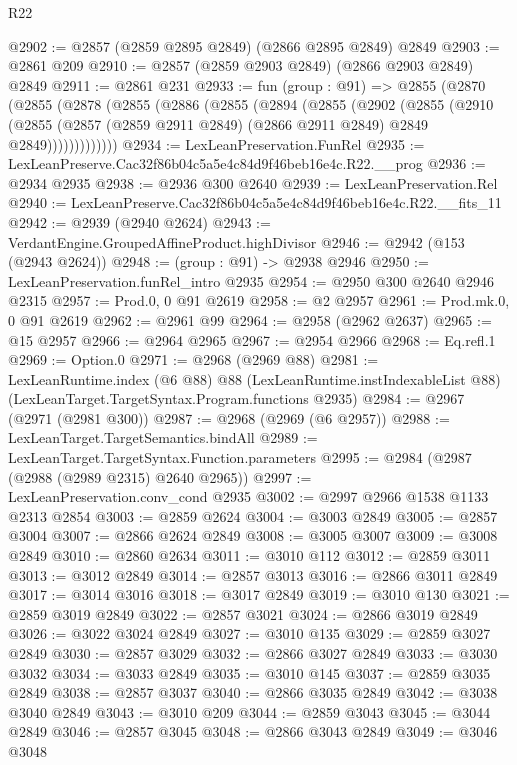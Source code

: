 \begin{lexlean}{R22}
\begin{coremodule}
@2902 := @2857 (@2859 @2895 @2849) (@2866 @2895 @2849) @2849
@2903 := @2861 @209
@2910 := @2857 (@2859 @2903 @2849) (@2866 @2903 @2849) @2849
@2911 := @2861 @231
@2933 := fun (group : @91) =>
  @2855
    (@2870
      (@2855
        (@2878
          (@2855
            (@2886
              (@2855
                (@2894
                  (@2855
                    (@2902
                      (@2855
                        (@2910
                          (@2855
                            (@2857 (@2859 @2911 @2849) (@2866 @2911 @2849) @2849 @2849)))))))))))))
@2934 := LexLeanPreservation.FunRel
@2935 := LexLeanPreserve.Cac32f86b04c5a5e4c84d9f46beb16e4c.R22.__prog
@2936 := @2934 @2935
@2938 := @2936 @300 @2640
@2939 := LexLeanPreservation.Rel
@2940 := LexLeanPreserve.Cac32f86b04c5a5e4c84d9f46beb16e4c.R22.__fits_11
@2942 := @2939 (@2940 @2624)
@2943 := VerdantEngine.GroupedAffineProduct.highDivisor
@2946 := @2942 (@153 (@2943 @2624))
@2948 := (group : @91) -> @2938 @2946
@2950 := LexLeanPreservation.funRel_intro @2935
@2954 := @2950 @300 @2640 @2946 @2315
@2957 := Prod.{0, 0} @91 @2619
@2958 := @2 @2957
@2961 := Prod.mk.{0, 0} @91 @2619
@2962 := @2961 @99
@2964 := @2958 (@2962 @2637)
@2965 := @15 @2957
@2966 := @2964 @2965
@2967 := @2954 @2966
@2968 := Eq.refl.{1}
@2969 := Option.{0}
@2971 := @2968 (@2969 @88)
@2981 := LexLeanRuntime.index
    (@6 @88)
    @88
    (LexLeanRuntime.instIndexableList @88)
    (LexLeanTarget.TargetSyntax.Program.functions @2935)
@2984 := @2967 (@2971 (@2981 @300))
@2987 := @2968 (@2969 (@6 @2957))
@2988 := LexLeanTarget.TargetSemantics.bindAll
@2989 := LexLeanTarget.TargetSyntax.Function.parameters
@2995 := @2984 (@2987 (@2988 (@2989 @2315) @2640 @2965))
@2997 := LexLeanPreservation.conv_cond @2935
@3002 := @2997 @2966 @1538 @1133 @2313 @2854
@3003 := @2859 @2624
@3004 := @3003 @2849
@3005 := @2857 @3004
@3007 := @2866 @2624 @2849
@3008 := @3005 @3007
@3009 := @3008 @2849
@3010 := @2860 @2634
@3011 := @3010 @112
@3012 := @2859 @3011
@3013 := @3012 @2849
@3014 := @2857 @3013
@3016 := @2866 @3011 @2849
@3017 := @3014 @3016
@3018 := @3017 @2849
@3019 := @3010 @130
@3021 := @2859 @3019 @2849
@3022 := @2857 @3021
@3024 := @2866 @3019 @2849
@3026 := @3022 @3024 @2849
@3027 := @3010 @135
@3029 := @2859 @3027 @2849
@3030 := @2857 @3029
@3032 := @2866 @3027 @2849
@3033 := @3030 @3032
@3034 := @3033 @2849
@3035 := @3010 @145
@3037 := @2859 @3035 @2849
@3038 := @2857 @3037
@3040 := @2866 @3035 @2849
@3042 := @3038 @3040 @2849
@3043 := @3010 @209
@3044 := @2859 @3043
@3045 := @3044 @2849
@3046 := @2857 @3045
@3048 := @2866 @3043 @2849
@3049 := @3046 @3048

\end{coremodule}
\end{lexlean}
